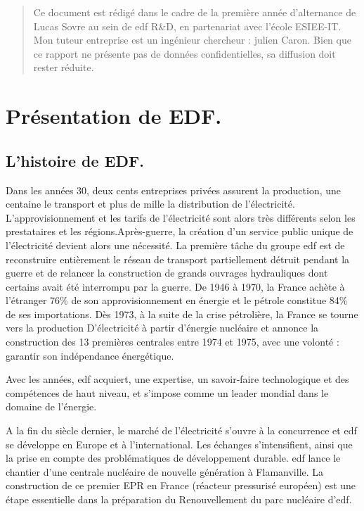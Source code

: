 \begin{abstract}
 Ce document est rédigé dans le cadre de la première année d'alternance de Lucas Sovre au sein de \acrshort{edf} R\&D, en partenariat avec l'école ESIEE-IT.
 Mon tuteur entreprise est un ingénieur chercheur : julien Caron. Bien que ce rapport ne présente pas de données confidentielles, sa diffusion doit rester réduite.
\end{abstract}
\chapter{Présentation de EDF.}
\section{L'histoire de EDF.}
Dans les années 30, deux cents entreprises privées assurent la production, une centaine le transport et plus de mille la distribution de l’électricité. L’approvisionnement et les tarifs de l’électricité sont alors très différents selon les prestataires et les régions.Après-guerre, la création d’un service public unique de l’électricité devient alors une nécessité. La première tâche du groupe \acrshort{edf} est de reconstruire entièrement le réseau de transport partiellement détruit pendant la guerre et de relancer la construction de grands ouvrages hydrauliques dont certains avait été interrompu par la guerre. De 1946 à 1970, la France achète à l’étranger 76\% de son approvisionnement en énergie et le pétrole constitue 84\% de ses importations. Dès 1973, à la suite de la crise pétrolière, la France se tourne vers la production D’électricité à partir d’énergie nucléaire et annonce la construction des 13 premières centrales entre 1974 et 1975, avec une volonté : garantir son indépendance énergétique.

Avec les années, \acrshort{edf} acquiert, une expertise, un savoir-faire technologique et des compétences de haut niveau, et s’impose comme un leader mondial dans le domaine de l’énergie.

A la fin du siècle dernier, le marché de l’électricité s’ouvre à la concurrence et \acrshort{edf} se développe en Europe et à l’international. Les échanges s’intensifient, ainsi que la prise en compte des problématiques de développement durable. \acrshort{edf} lance le chantier d’une centrale nucléaire de nouvelle génération à Flamanville. La construction de ce premier EPR en France (réacteur pressurisé européen) est une étape essentielle dans la préparation du Renouvellement du parc nucléaire d’\acrshort{edf}.


